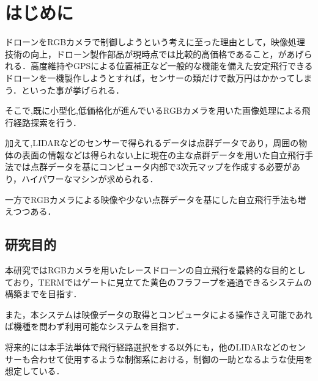 \section{はじめに}
ドローンをRGBカメラで制御しようという考えに至った理由として，映像処理技術の向上，ドローン製作部品が現時点では比較的高価格であること，があげられる．高度維持やGPSによる位置補正など一般的な機能を備えた安定飛行できるドローンを一機製作しようとすれば，センサーの類だけで数万円はかかってしまう．といった事が挙げられる．

そこで,既に小型化,低価格化が進んでいるRGBカメラを用いた画像処理による飛行経路探索を行う．

加えて,LIDARなどのセンサーで得られるデータは点群データであり，周囲の物体の表面の情報などは得られない上に現在の主な点群データを用いた自立飛行手法では点群データを基にコンピュータ内部で3次元マップを作成する必要があり，ハイパワーなマシンが求められる．

一方でRGBカメラによる映像や少ない点群データを基にした自立飛行手法も増えつつある\cite{Nanomap}\cite{SfMDrone}\cite{DeepDrone}．

\subsection{研究目的}
本研究ではRGBカメラを用いたレースドローンの自立飛行を最終的な目的としており，TERMではゲートに見立てた黄色のフラフープを通過できるシステムの構築までを目指す．

また，本システムは映像データの取得とコンピュータによる操作さえ可能であれば機種を問わず利用可能なシステムを目指す．

将来的には本手法単体で飛行経路選択をする以外にも，他のLIDARなどのセンサーも合わせて使用するような制御系における，制御の一助となるような使用を想定している．
